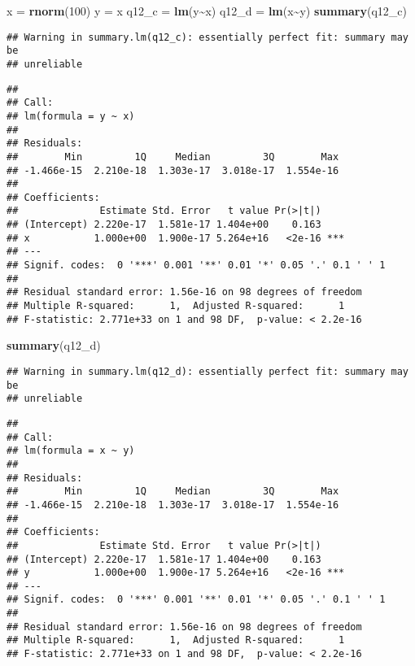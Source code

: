 \documentclass[
]{article}
\newenvironment{Shaded}{\begin{snugshade}}{\end{snugshade}}
\newcommand{\DecValTok}[1]{\textcolor[rgb]{0.00,0.00,0.81}{#1}}
\newcommand{\FunctionTok}[1]{\textcolor[rgb]{0.13,0.29,0.53}{\textbf{#1}}}
\newcommand{\NormalTok}[1]{#1}
\newcommand{\OtherTok}[1]{\textcolor[rgb]{0.56,0.35,0.01}{#1}}
\newcommand{\SpecialCharTok}[1]{\textcolor[rgb]{0.81,0.36,0.00}{\textbf{#1}}}
\begin{document}
\begin{Shaded}
\begin{Highlighting}[]
\NormalTok{x }\OtherTok{=} \FunctionTok{rnorm}\NormalTok{(}\DecValTok{100}\NormalTok{)}
\NormalTok{y }\OtherTok{=}\NormalTok{ x }
\NormalTok{q12\_c }\OtherTok{=} \FunctionTok{lm}\NormalTok{(y}\SpecialCharTok{\textasciitilde{}}\NormalTok{x)}
\NormalTok{q12\_d }\OtherTok{=} \FunctionTok{lm}\NormalTok{(x}\SpecialCharTok{\textasciitilde{}}\NormalTok{y)}
\FunctionTok{summary}\NormalTok{(q12\_c)}
\end{Highlighting}
\end{Shaded}

\begin{verbatim}
## Warning in summary.lm(q12_c): essentially perfect fit: summary may be
## unreliable
\end{verbatim}

\begin{verbatim}
## 
## Call:
## lm(formula = y ~ x)
## 
## Residuals:
##        Min         1Q     Median         3Q        Max 
## -1.466e-15  2.210e-18  1.303e-17  3.018e-17  1.554e-16 
## 
## Coefficients:
##              Estimate Std. Error   t value Pr(>|t|)    
## (Intercept) 2.220e-17  1.581e-17 1.404e+00    0.163    
## x           1.000e+00  1.900e-17 5.264e+16   <2e-16 ***
## ---
## Signif. codes:  0 '***' 0.001 '**' 0.01 '*' 0.05 '.' 0.1 ' ' 1
## 
## Residual standard error: 1.56e-16 on 98 degrees of freedom
## Multiple R-squared:      1,  Adjusted R-squared:      1 
## F-statistic: 2.771e+33 on 1 and 98 DF,  p-value: < 2.2e-16
\end{verbatim}

\begin{Shaded}
\begin{Highlighting}[]
\FunctionTok{summary}\NormalTok{(q12\_d)}
\end{Highlighting}
\end{Shaded}

\begin{verbatim}
## Warning in summary.lm(q12_d): essentially perfect fit: summary may be
## unreliable
\end{verbatim}

\begin{verbatim}
## 
## Call:
## lm(formula = x ~ y)
## 
## Residuals:
##        Min         1Q     Median         3Q        Max 
## -1.466e-15  2.210e-18  1.303e-17  3.018e-17  1.554e-16 
## 
## Coefficients:
##              Estimate Std. Error   t value Pr(>|t|)    
## (Intercept) 2.220e-17  1.581e-17 1.404e+00    0.163    
## y           1.000e+00  1.900e-17 5.264e+16   <2e-16 ***
## ---
## Signif. codes:  0 '***' 0.001 '**' 0.01 '*' 0.05 '.' 0.1 ' ' 1
## 
## Residual standard error: 1.56e-16 on 98 degrees of freedom
## Multiple R-squared:      1,  Adjusted R-squared:      1 
## F-statistic: 2.771e+33 on 1 and 98 DF,  p-value: < 2.2e-16
\end{verbatim}
\end{document}
